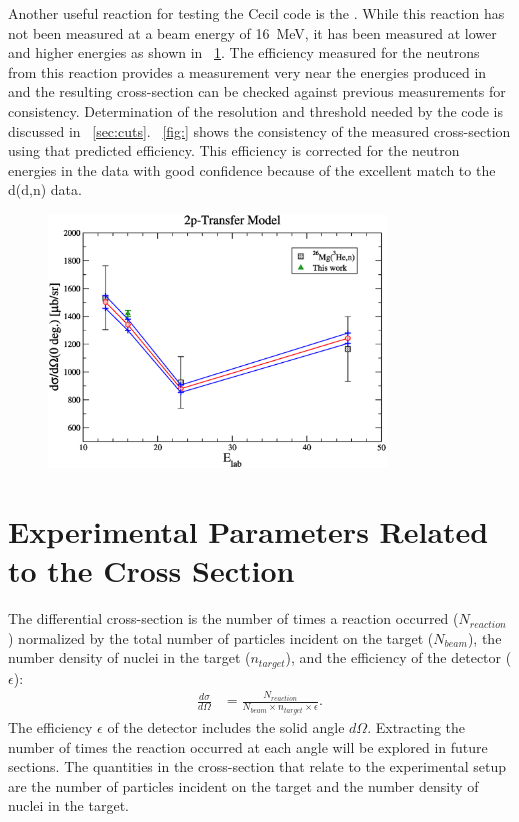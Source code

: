 Another useful reaction for testing the Cecil code is the \MgReaction.  While this reaction has not been measured at a beam energy of 16~MeV, it has been measured at lower and higher energies as shown in {\fig}~\ref{fig:efficiencyCalib}.  The efficiency measured for the neutrons from this reaction provides a measurement very near the energies produced in \reaction and the resulting cross-section can be checked against previous measurements for consistency.  Determination of the resolution and threshold needed by the code is discussed in {\sect}~\ref{sec:cuts}.  {\fig}~\ref{fig:} shows the consistency of the measured cross-section using that predicted efficiency.  This efficiency is corrected for the neutron energies in the \reaction data with good confidence because of the excellent match to the d(d,n) data.
\begin{figure}[!htbp]
\centering
\includegraphics[width=0.8\textwidth]{figures/magnesiumMatch.eps}
\caption{}
\label{fig:efficiencyCalib}
\end{figure}

\section{Experimental Parameters Related to the Cross Section}

The differential cross-section is the number of times a reaction occurred ($N_{reaction}$) normalized by the total number of particles incident on the target ($N_{beam}$), the number density of nuclei in the target ($n_{target}$), and the efficiency of the detector ($\epsilon$):
\begin{align}
\frac{d\sigma}{d\Omega} &= \frac{N_{reaction}}{N_{beam} \times n_{target} \times \epsilon}.
\label{eq:cross_section}
\end{align}
The efficiency $\epsilon$ of the detector includes the solid angle $d\Omega$.  Extracting the number of times the reaction occurred at each angle will be explored in future sections.  The quantities in the cross-section that relate to the experimental setup are the number of particles incident on the target and the number density of nuclei in the target.


